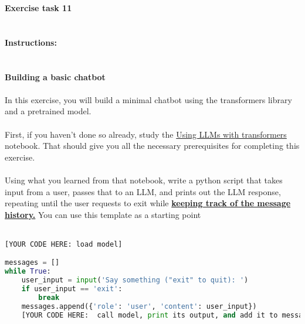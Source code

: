 \documentclass{article}
\begin{document}
\pagestyle{fancy}
\fancyhead{}


\textbf{Exercise task 11} \\\\\\
\textbf{Instructions:} \\\\\\
\textbf{Building a basic chatbot} \\\\
In this exercise, you will build a minimal chatbot using the transformers 
library and a pretrained model. \\\\
First, if you haven't done so already, study the 
\href{https://github.com/TurkuNLP/textual-data-analysis-course/blob/main/llms_using_transformers_library.ipynb}{Using LLMs with transformers}
notebook. That should give you all the necessary prerequisites for 
completing this exercise. \\\\
Using what you learned from that notebook, write a python script that takes 
input from a user, passes that to an LLM, and prints out the LLM response, 
repeating until the user requests to exit while 
\textbf{\underline{keeping track of the message history.}} 
You can use this template as a starting point \\\\
\begin{lstlisting}[language=Python]
[YOUR CODE HERE: load model]

messages = []
while True:
    user_input = input('Say something ("exit" to quit): ')
    if user_input == 'exit':
        break
    messages.append({'role': 'user', 'content': user_input})
    [YOUR CODE HERE:  call model, print its output, and add it to messages]
\end{lstlisting}
\end{document}
